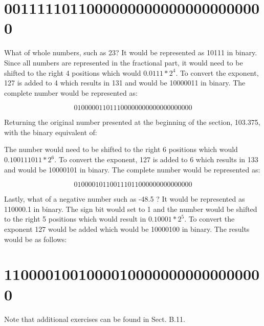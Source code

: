 \documentclass[10pt]{book}
\begin{document}
\begin{center}
\begin{center}
\begin{center}
\begin{center}
\begin{center}
\section*{00111110110000000000000000000000}
What of whole numbers, such as 23? It would be represented as 10111 in binary. Since all numbers are represented in the fractional part, it would need to be shifted to the right 4 positions which would $0.0111 * 2^{4}$. To convert the exponent, 127 is added to 4 which results in 131 and would be 10000011 in binary. The complete number would be represented as:

$$
010000011011100000000000000000000
$$

Returning the original number presented at the beginning of the section, 103.375, with the binary equivalent of:

The number would need to be shifted to the right 6 positions which would $0.100111011 * 2^{6}$. To convert the exponent, 127 is added to 6 which results in 133 and would be 10000101 in binary. The complete number would be represented as:

$$
010000101100111011000000000000000
$$

Lastly, what of a negative number such as -48.5 ? It would be represented as 110000.1 in binary. The sign bit would set to 1 and the number would be shifted to the right 5 positions which would result in $0.10001 * 2^{5}$. To convert the exponent 127 would be added which would be 10000100 in binary. The results would be as follows:

\section*{11000010010000100000000000000000}
Note that additional exercises can be found in Sect. B.11.


\end{center}
\end{center}
\end{center}
\end{center}
\end{center}
\end{document}
